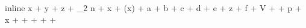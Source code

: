 inline
\sin x + \cos y + \tan z + \log_2 n + \ln x + \exp(x) + \arcsin a + \sinh b + \cot c + \sec d + \csc e + \arg z + \ker f + \dim V + \hom + \deg p + \lg x + \arccos + \arctan + \cosh + \tanh + \coth